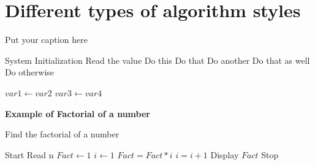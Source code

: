 \documentclass{article}
\begin{document}
\section{Different types of algorithm styles}



\begin{algorithm}
\caption{Put your caption here}
\begin{algorithmic}[1]

    \State System Initialization
    \State Read the value 
        \State Do this
        \State Do that
                  
        \State Do another
        \State Do that as well
        \Else
        \State Do otherwise
        \EndIf
    \EndIf

      
        \State $var1 \leftarrow var2$  
        \State $var3 \leftarrow var4$
    \EndWhile  \label{test}
\EndProcedure
\end{algorithmic}
\end{algorithm}


\textbf{Example of Factorial of a number}

\begin{algorithm}
\caption{Find the factorial of a number}
\begin{algorithmic}[1]
    \State Start
    \State Read n
    \State $Fact \leftarrow 1$
    \State $i \leftarrow 1$
    \State $Fact = Fact * i $ 
    \State $i = i+1$
      \EndWhile
      \State Display $Fact$
      \State Stop
    \EndProcedure
\end{algorithmic}
\end{algorithm}
\end{document}
